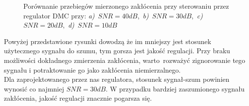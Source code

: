 \begin{figure}[t]
        \caption{Porównanie przebiegów mierzonego zakłócenia przy sterowaniu przez regulator DMC przy:  
        \mbox{\emph{a)} $SNR = \num{40}dB$, \emph{b)} $SNR = \num{30}dB$, 
        \emph{c)} $SNR = \num{20}dB$, \emph{d)} $SNR = \num{10}dB$}}
        \label{zad7_sin_z}
\end{figure}
\FloatBarrier

Powyżej przedstawione rysunki dowodzą że im mniejszy jest stosunek użytecznego sygnału do szumu, tym 
gorsza jest jakość regulacji. Przy braku możliwości dokładnego zmierzenia zakłócenia, warto rozważyć
zignorowanie tego sygnału i potraktowanie go jako zakłócenia niemierzalnego.\\

Dla zaprojektowanego przez nas regulatora, stosunek sygnał-szum powinien wynosić co najmniej $SNR = \num{30}dB$. 
W przypadku bardziej zaszumionego sygnału zakłócenia, jakość regulacji znacznie pogarsza się. 



